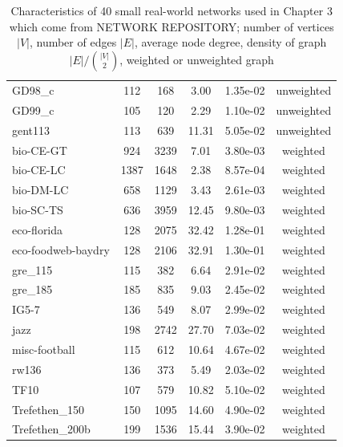 \documentclass[senior,final,11pt]{iscs-thesis}
\begin{document}
\begin{table}[htb]
\begin{center}
{\begin{tabular}{l | c c c c c}
        GD98\_c & 112 & 168 & 3.00 & 1.35e-02 & unweighted\\
        GD99\_c & 105 & 120 & 2.29 & 1.10e-02 & unweighted\\
        gent113 & 113 & 639 & 11.31 & 5.05e-02 & unweighted\\
        bio-CE-GT & 924 & 3239 & 7.01 & 3.80e-03 & weighted\\
        bio-CE-LC & 1387 & 1648 & 2.38 & 8.57e-04 & weighted\\
        bio-DM-LC & 658 & 1129 & 3.43 & 2.61e-03 & weighted\\
        bio-SC-TS & 636 & 3959 & 12.45 & 9.80e-03 & weighted\\
        eco-florida & 128 & 2075 & 32.42 & 1.28e-01 & weighted\\
        eco-foodweb-baydry & 128 & 2106 & 32.91 & 1.30e-01 & weighted\\
        gre\_115 & 115 & 382 & 6.64 & 2.91e-02 & weighted\\
        gre\_185 & 185 & 835 & 9.03 & 2.45e-02 & weighted\\
        IG5-7 & 136 & 549 & 8.07 & 2.99e-02 & weighted\\
        jazz & 198 & 2742 & 27.70 & 7.03e-02 & weighted\\
        misc-football & 115 & 612 & 10.64 & 4.67e-02 & weighted\\
        rw136 & 136 & 373 & 5.49 & 2.03e-02 & weighted\\
        TF10 & 107 & 579 & 10.82 & 5.10e-02 & weighted\\
        Trefethen\_150 & 150 & 1095 & 14.60 & 4.90e-02 & weighted\\
        Trefethen\_200b & 199 & 1536 & 15.44 & 3.90e-02 & weighted\\
      \end{tabular}
      }
      \caption{Characteristics of 40 small real-world networks used in Chapter 3 which come from NETWORK REPOSITORY; number of vertices $|V|$, number of edges $|E|$, average node degree, density of graph $|E|/ \binom{|V|}{2}$, weighted or unweighted graph}
      \label{tab:data_spe}
    \end{center}
  \end{table}
\end{document}
